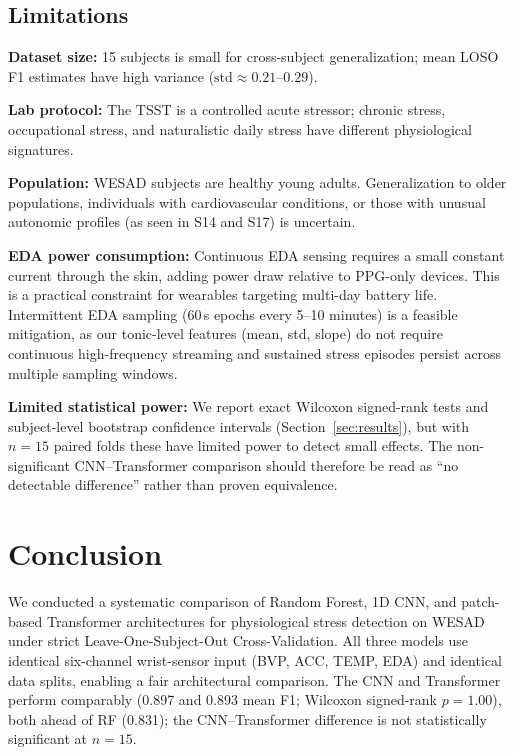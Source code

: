 \documentclass[10pt,twocolumn]{article}
\begin{document}
\subsection{Limitations}

\textbf{Dataset size:} 15 subjects is small for cross-subject generalization;
mean LOSO F1 estimates have high variance ($\text{std} \approx 0.21$--$0.29$).

\textbf{Lab protocol:} The TSST is a controlled acute stressor; chronic stress,
occupational stress, and naturalistic daily stress have different physiological
signatures.

\textbf{Population:} WESAD subjects are healthy young adults. Generalization
to older populations, individuals with cardiovascular conditions, or those
with unusual autonomic profiles (as seen in S14 and S17) is uncertain.

\textbf{EDA power consumption:} Continuous EDA sensing requires a small
constant current through the skin, adding power draw relative to PPG-only
devices. This is a practical constraint for wearables targeting multi-day
battery life. Intermittent EDA sampling (60\,s epochs every 5--10 minutes)
is a feasible mitigation, as our tonic-level features (mean, std, slope)
do not require continuous high-frequency streaming and sustained
stress episodes persist across multiple sampling windows.

\textbf{Limited statistical power:} We report exact Wilcoxon signed-rank
tests and subject-level bootstrap confidence intervals
(Section~\ref{sec:results}), but with $n=15$ paired folds these have
limited power to detect small effects. The non-significant
CNN--Transformer comparison should therefore be read as ``no detectable
difference'' rather than proven equivalence.

\section{Conclusion}
\label{sec:conclusion}

We conducted a systematic comparison of Random Forest, 1D CNN, and patch-based
Transformer architectures for physiological stress detection on WESAD under
strict Leave-One-Subject-Out Cross-Validation. All three models use identical
six-channel wrist-sensor input (BVP, ACC, TEMP, EDA) and identical data splits,
enabling a fair architectural comparison. The CNN and Transformer perform
comparably (0.897 and 0.893 mean F1; Wilcoxon signed-rank $p=1.00$), both
ahead of RF (0.831); the CNN--Transformer difference is not statistically
significant at $n=15$.
\end{document}
